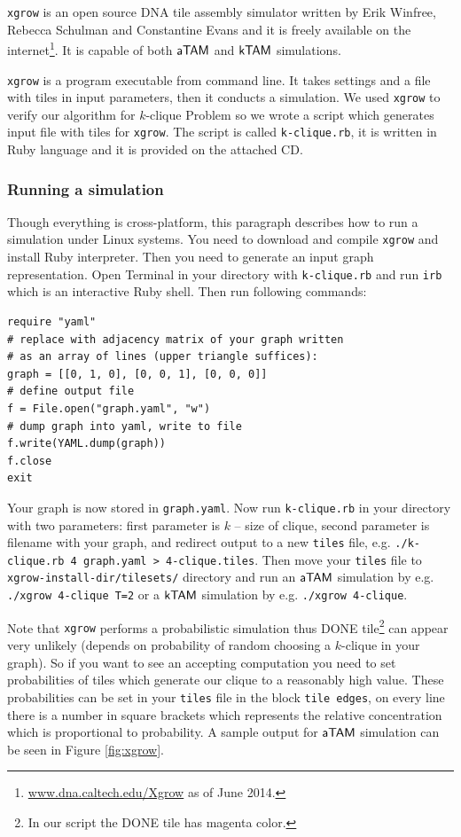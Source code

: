 {\tt xgrow} is an open source DNA tile assembly simulator written by Erik Winfree, Rebecca Schulman and Constantine Evans and it is freely available on the internet\footnote{\url{www.dna.caltech.edu/Xgrow} as of June 2014.}. It is capable of both $\mathsf{aTAM}$ and $\mathsf{kTAM}$ simulations.

{\tt xgrow} is a program executable from command line. It takes settings and a file with tiles in input parameters, then it conducts a simulation. We used {\tt xgrow} to verify our algorithm for $k$-clique Problem so we wrote a script which generates input file with tiles for {\tt xgrow}. The script is called {\tt k-clique.rb}, it is written in Ruby language and it is provided on the attached CD.

\subsubsection*{Running a simulation}

Though everything is cross-platform, this paragraph describes how to run a simulation under Linux systems. You need to download and compile {\tt xgrow} and install Ruby interpreter. Then you need to generate an input graph representation. Open Terminal in your directory with {\tt k-clique.rb} and run {\tt irb} which is an interactive Ruby shell. Then run following commands:
\begin{verbatim}
require "yaml"
# replace with adjacency matrix of your graph written
# as an array of lines (upper triangle suffices):
graph = [[0, 1, 0], [0, 0, 1], [0, 0, 0]]
# define output file
f = File.open("graph.yaml", "w")
# dump graph into yaml, write to file
f.write(YAML.dump(graph))
f.close
exit
\end{verbatim}
Your graph is now stored in {\tt graph.yaml}. Now run {\tt k-clique.rb} in your directory with two parameters: first parameter is $k$ -- size of clique, second parameter is filename with your graph, and redirect output to a new {\tt tiles} file, e.g. {\tt ./k-clique.rb 4 graph.yaml > 4-clique.tiles}. Then move your {\tt tiles} file to {\tt xgrow-install-dir/tilesets/} directory and run an $\mathsf{aTAM}$ simulation by e.g. {\tt ./xgrow 4-clique T=2} or a $\mathsf{kTAM}$ simulation by e.g. {\tt ./xgrow 4-clique}.

Note that {\tt xgrow} performs a probabilistic simulation thus DONE tile\footnote{In our script the DONE tile has magenta color.} can appear very unlikely (depends on probability of random choosing a $k$-clique in your graph). So if you want to see an accepting computation you need to set probabilities of tiles which generate our clique to a reasonably high value. These probabilities can be set in your {\tt tiles} file in the block {\tt tile edges}, on every line there is a number in square brackets which represents the relative concentration which is proportional to probability. A sample output for $\mathsf{aTAM}$ simulation can be seen in Figure \ref{fig:xgrow}.

